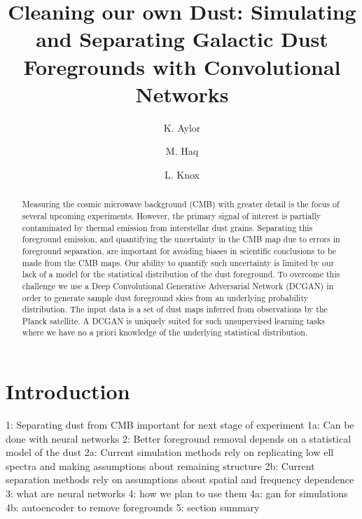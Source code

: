 \documentclass[twocolumn]{aastex62}
\begin{document}
\title{Cleaning our own Dust: Simulating and Separating Galactic Dust Foregrounds with Convolutional Networks}
\author{K. Aylor}
\author{ M. Haq}
\author{L. Knox }



\begin{abstract}
Measuring the cosmic microwave background (CMB) with greater detail is the focus of several upcoming experiments. However, the primary signal of interest is partially contaminated by thermal emission from interstellar dust grains. Separating this foreground emission, and
quantifying the uncertainty in the CMB map due to errors in foreground separation, are
important for avoiding biases in scientific conclusions to be made from the CMB maps. Our ability to quantify such uncertainty is limited by our lack of a model for the statistical
distribution of the dust foreground. To overcome this challenge we use a Deep Convolutional Generative Adversarial Network (DCGAN) in order to generate sample dust foreground skies from an underlying probability distribution. The input data is a set of dust maps inferred from observations by the Planck satellite. A DCGAN is uniquely suited for such unsupervised learning tasks where we have no a priori knowledge of the underlying statistical distribution.
\end{abstract}




\section{Introduction}
1: Separating dust from CMB important for next stage of experiment
1a: Can be done with neural networks
2: Better foreground removal depends on a statistical model of the dust
2a: Current simulation methods rely on replicating low ell spectra and making assumptions about remaining structure
2b: Current separation methods rely on assumptions about spatial and frequency dependence
3: what are neural networks
4: how we plan to use them
4a: gan for simulations
4b: autoencoder to remove foregrounds
5: section summary
\end{document}
